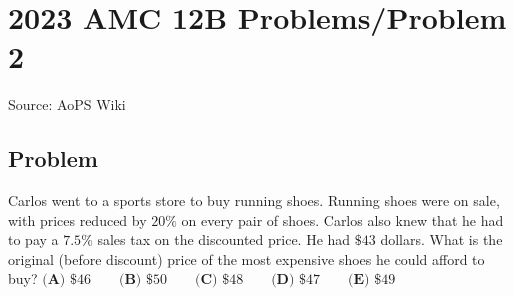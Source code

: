 \documentclass[12pt]{article}
\begin{document}
\section*{{2023 AMC 12B Problems/Problem 2}}
Source: AoPS Wiki

\subsection*{Problem}
Carlos went to a sports store to buy running shoes. Running shoes were on sale, with prices reduced by $20\%$ on every pair of shoes. Carlos also knew that he had to pay a $7.5\%$ sales tax on the discounted price. He had $\$43$ dollars. What is the original (before discount) price of the most expensive shoes he could afford to buy? $\textbf{(A) }\$46\qquad\textbf{(B) }\$50\qquad\textbf{(C) }\$48\qquad\textbf{(D) }\$47\qquad\textbf{(E) }\$49$
\end{document}
